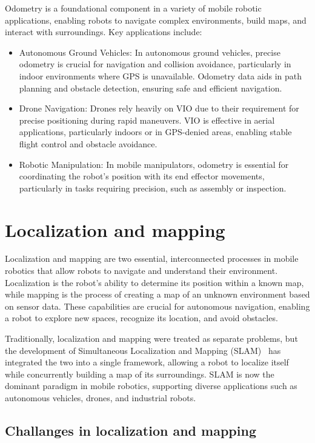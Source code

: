 Odometry is a foundational component in a variety of mobile robotic applications, enabling robots to navigate complex environments, build maps, and interact with surroundings. Key applications include:
\begin{itemize}
    \item Autonomous Ground Vehicles: In autonomous ground vehicles, precise odometry is crucial for navigation and collision avoidance, particularly in indoor environments where GPS is unavailable. Odometry data aids in path planning and obstacle detection, ensuring safe and efficient navigation.
    \item Drone Navigation: Drones rely heavily on VIO due to their requirement for precise positioning during rapid maneuvers. VIO is effective in aerial applications, particularly indoors or in GPS-denied areas, enabling stable flight control and obstacle avoidance.
    \item Robotic Manipulation: In mobile manipulators, odometry is essential for coordinating the robot's position with its end effector movements, particularly in tasks requiring precision, such as assembly or inspection.
\end{itemize}

\section{Localization and mapping}

Localization and mapping are two essential, interconnected processes in mobile robotics that allow robots to navigate and understand their environment. Localization is the robot's ability to determine its position within a known map, while mapping is the process of creating a map of an unknown environment based on sensor data. These capabilities are crucial for autonomous navigation, enabling a robot to explore new spaces, recognize its location, and avoid obstacles.

Traditionally, localization and mapping were treated as separate problems, but the development of Simultaneous Localization and Mapping (SLAM)~\cite{slam} has integrated the two into a single framework, allowing a robot to localize itself while concurrently building a map of its surroundings. SLAM is now the dominant paradigm in mobile robotics, supporting diverse applications such as autonomous vehicles, drones, and industrial robots.

\subsection{Challanges in localization and mapping}

